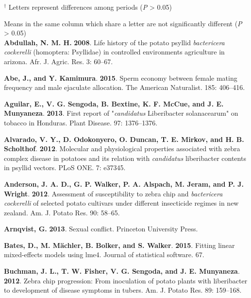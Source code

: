 \documentclass[]{article}
\begin{document}
\(^\dagger\) Letters represent differences among periods (\emph{P}
\textgreater{} 0.05)

Means in the same column which share a letter are not significantly
different (\emph{P} \textgreater{} 0.05)\\

\hypertarget{refs}{}
\leavevmode\hypertarget{ref-Abdullah2008}{}%
\textbf{Abdullah, N. M. H.} \textbf{2008}. Life history of the potato
psyllid \emph{bactericera cockerelli} (homoptera: Psyllidae) in
controlled environments agriculture in arizona. Afr. J. Agric. Res. 3:
60--67.

\leavevmode\hypertarget{ref-Abe2015}{}%
\textbf{Abe, J., and Y. Kamimura}. \textbf{2015}. Sperm economy between
female mating frequency and male ejaculate allocation. The American
Naturalist. 185: 406--416.

\leavevmode\hypertarget{ref-Aguilar2013}{}%
\textbf{Aguilar, E., V. G. Sengoda, B. Bextine, K. F. McCue, and J. E.
Munyaneza}. \textbf{2013}. First report of "\emph{candidatus}
Liberibacter solanacearum" on tobacco in Honduras. Plant Disease. 97:
1376--1376.

\leavevmode\hypertarget{ref-Alvarado2012}{}%
\textbf{Alvarado, V. Y., D. Odokonyero, O. Duncan, T. E. Mirkov, and H.
B. Scholthof}. \textbf{2012}. Molecular and physiological properties
associated with zebra complex disease in potatoes and its relation with
\emph{candidatus} liberibacter contents in psyllid vectors. PLoS ONE. 7:
e37345.

\leavevmode\hypertarget{ref-Anderson2012}{}%
\textbf{Anderson, J. A. D., G. P. Walker, P. A. Alspach, M. Jeram, and
P. J. Wright}. \textbf{2012}. Assessment of susceptibility to zebra chip
and \emph{bactericera cockerelli} of selected potato cultivars under
different insecticide regimes in new zealand. Am. J. Potato Res. 90:
58--65.

\leavevmode\hypertarget{ref-Arnqvist2013}{}%
\textbf{Arnqvist, G.} \textbf{2013}. Sexual conflict. Princeton
University Press.

\leavevmode\hypertarget{ref-Bates2015}{}%
\textbf{Bates, D., M. Mächler, B. Bolker, and S. Walker}. \textbf{2015}.
Fitting linear mixed-effects models using lme4. Journal of statistical
software. 67.

\leavevmode\hypertarget{ref-Buchman2012}{}%
\textbf{Buchman, J. L., T. W. Fisher, V. G. Sengoda, and J. E.
Munyaneza}. \textbf{2012}. Zebra chip progression: From inoculation of
potato plants with liberibacter to development of disease symptoms in
tubers. Am. J. Potato Res. 89: 159--168.
\end{document}
